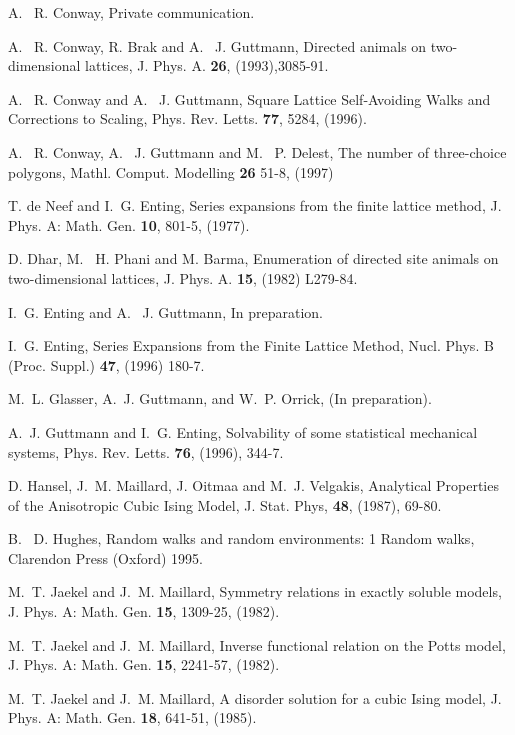 \begin{thebibliography}{10}
A. ~R. Conway,
\newblock Private communication.

A. ~R. Conway, R. Brak and A. ~J. Guttmann,
\newblock Directed animals on two-dimensional lattices,
J. Phys. A. {\bf 26}, (1993),3085-91.

A. ~R. Conway and A. ~J. Guttmann,
\newblock  Square Lattice Self-Avoiding Walks and Corrections to Scaling,
 Phys. Rev. Letts. {\bf 77}, 5284, (1996).

A. ~R. Conway, A. ~J. Guttmann and M. ~P. Delest,
\newblock The number of three-choice polygons,
Mathl. Comput. Modelling {\bf 26} 51-8, (1997)

  T. de Neef and I.~G. Enting,
  \newblock  Series expansions from the finite lattice method, 
  J. Phys. A: Math. Gen. {\bf 10}, 801-5, (1977).

D. Dhar, M. ~H. Phani and M. Barma,
\newblock Enumeration of directed site animals on two-dimensional
lattices, J. Phys. A. {\bf 15}, (1982) L279-84.

I.~G. Enting and A. ~J. Guttmann,
\newblock In preparation.

  I.~G. Enting,
 \newblock Series Expansions from the Finite Lattice Method,
 Nucl. Phys. B (Proc. Suppl.) {\bf 47},  (1996) 180-7.

  M.~L. Glasser, A.~J. Guttmann, and W.~P. Orrick,
  \newblock (In preparation).

  A.~J. Guttmann and I.~G. Enting,
  \newblock Solvability of some statistical mechanical systems,
  Phys. Rev. Letts. {\bf 76}, (1996), 344-7.

D. Hansel, J.~M. Maillard, J. Oitmaa and M.~J. Velgakis,
\newblock Analytical Properties of the Anisotropic Cubic Ising Model, 
J. Stat. Phys, {\bf 48}, (1987), 69-80.

B. ~D. Hughes,
\newblock Random walks and random environments: 1 Random walks,
Clarendon Press (Oxford) 1995.

M.~T. Jaekel and J.~M. Maillard,
\newblock Symmetry relations in exactly soluble models,
J. Phys. A: Math. Gen. {\bf 15},  1309-25, (1982).

M.~T. Jaekel and J.~M. Maillard,
\newblock Inverse functional relation on the Potts model,
J. Phys. A: Math. Gen. {\bf 15},  2241-57, (1982).

M.~T. Jaekel and J.~M. Maillard,
\newblock A disorder solution for a cubic Ising model, 
J. Phys. A: Math. Gen. {\bf 18}, 641-51, (1985).


\end{thebibliography}
